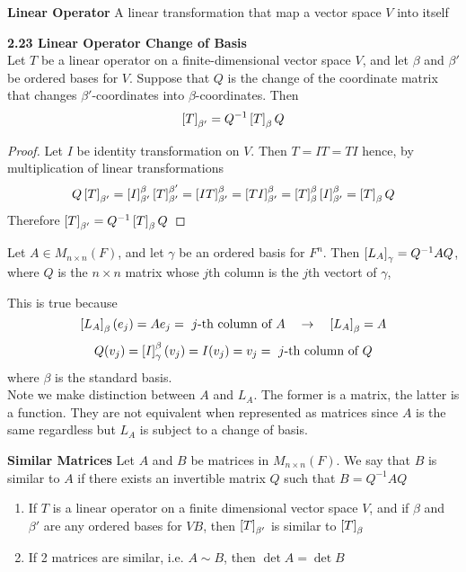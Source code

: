 \documentclass[11pt]{article}
\begin{document}
\begin{defn*}
    \textbf{Linear Operator} A linear transformation that map a vector space $V$ into itself
\end{defn*}

\begin{theorem*}
    \textbf{2.23 Linear Operator Change of Basis} \\
    Let $T$ be a linear operator on a finite-dimensional vector space $V$, and let $\beta$ and $\beta'$ be ordered bases for $V$. Suppose that $Q$ is the change of the coordinate matrix that changes $\beta'$-coordinates into $\beta$-coordinates. Then 
    \[
        \left[ T \right]_{\beta'} = Q^{-1}\left[ T \right]_{\beta}Q    
    \]
    \begin{proof}
        Let $I$ be identity transformation on $V$. Then $T=IT=TI$ hence, by multiplication of linear transformations
        \[
            Q\left[ T \right]_{\beta'} = \left[ I \right]_{\beta'}^{\beta}\left[ T \right]_{\beta'}^{\beta'}
             = \left[ IT \right]_{\beta'}^{\beta} = \left[ TI \right]_{\beta'}^{\beta} 
             = \left[ T \right]_{\beta}^{\beta} \left[ I \right]_{\beta'}^{\beta} = \left[ T \right]_{\beta} Q
        \]
        Therefore $\left[ T \right]_{\beta'} = Q^{-1} \left[ T \right]_{\beta} Q$
    \end{proof}
\end{theorem*}

\begin{corollary*}
    Let $A\in M_{n\times n}(F)$, and let $\gamma$ be an ordered basis for $F^n$. Then $\left[ L_A \right]_{\gamma} = Q^{-1}AQ$, where $Q$ is the $n\times n$ matrix whose $j$th column is the $j$th vectort of $\gamma$, 
    \begin{rem}
        This is true because 
        \[
            \left[ L_A \right]_{\beta}(e_j) = Ae_j = \text{ $j$-th column of $A$}
            \quad \rightarrow \quad 
            \left[ L_A \right]_{\beta} = A
        \]
        \[
            Q(v_j) = \left[ I \right]_{\gamma}^{\beta}(v_j) = I(v_j) = v_j = \text{ $j$-th column of $Q$}
        \]
        where $\beta$ is the standard basis. \\
        Note we make distinction between $A$ and $L_A$. The former is a matrix, the latter is a function. They are not equivalent when represented as matrices since $A$ is the same regardless but $L_A$ is subject to a change of basis. 
    \end{rem}    
\end{corollary*}

\begin{defn*}
    \textbf{Similar Matrices} Let $A$ and $B$ be matrices in $M_{n\times n}(F)$. We say that $B$ is similar to $A$ if there exists an invertible matrix $Q$ such that $B = Q^{-1}AQ$
    \begin{enumerate}
        \item If $T$ is a linear operator on a finite dimensional vector space $V$, and if $\beta$ and $\beta'$ are any ordered bases for $VB$, then $\left[ T \right]_{\beta'}$ is similar to $\left[ T \right]_{\beta}$
        \item If 2 matrices are similar, i.e. $A\sim B$, then $\det{A} = \det{B}$
    \end{enumerate}
\end{defn*}
\end{document}

